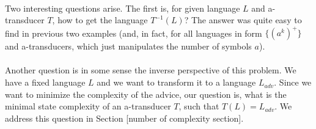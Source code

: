 \documentclass[12pt,oneside,a4paper]{book}
\begin{document}
\paragraph{}
Two interesting questions arise. The first is, for given language $L$ and a-transducer $T$, how to get the language $T^{-1}(L)$? The answer was quite easy to find in previous two examples (and, in fact, for all languages in form $\{ (a^k)^+ \}$ and a-transducers, which just manipulates the number of symbols $a$).

\paragraph{}
Another question is in some sense the inverse perspective of this problem. We have a fixed language $L$ and we want to transform it to a language $L_{adv}$. Since we want to minimize the complexity of the advice, our question is, what is the minimal state complexity of an a-transducer $T$, such that $T(L) = L_{adv}$. We address this question in Section [number of complexity section].
\end{document}
